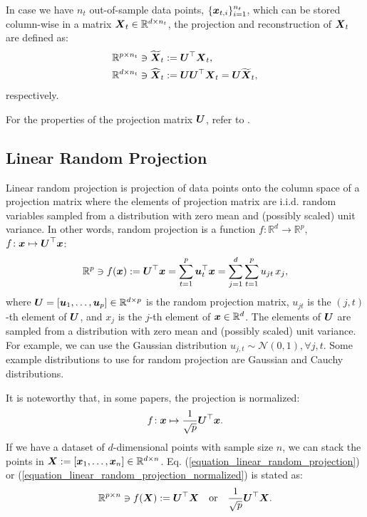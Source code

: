 \documentclass{article}
\def\b{\ensuremath\boldsymbol}
\begin{document}
In case we have $n_t$ out-of-sample data points, $\{\b{x}_{t,i}\}_{i=1}^{n_t}$, which can be stored column-wise in a matrix $\b{X}_t \in \mathbb{R}^{d \times n_t}$, the projection and reconstruction of $\b{X}_t$ are defined as:
\begin{align}
&\mathbb{R}^{p \times n_t} \ni \widetilde{\b{X}}_t := \b{U}^\top \b{X}_t, \label{equation_projection_outOfSample_SeveralPoints_severalDirections} \\
&\mathbb{R}^{d \times n_t} \ni \widehat{\b{X}}_t := \b{U}\b{U}^\top \b{X}_t = \b{U} \widetilde{\b{X}}_t, \label{equation_reconstruction_outOfSample_SeveralPoints_severalDirections}
\end{align}
respectively.

For the properties of the projection matrix $\b{U}$, refer to \cite{ghojogh2019unsupervised}.

\subsection{Linear Random Projection}

Linear random projection is projection of data points onto the column space of a projection matrix where the elements of projection matrix are i.i.d. random variables sampled from a distribution with zero mean and (possibly scaled) unit variance. In other words, random projection is a function $f\!: \mathbb{R}^d \rightarrow \mathbb{R}^p$, $f\!: \b{x} \mapsto \b{U}^\top \b{x}$:
\begin{align}\label{equation_linear_random_projection}
\mathbb{R}^p \ni f(\b{x}) := \b{U}^\top \b{x} = \sum_{t=1}^p \b{u}_t^\top \b{x} = \sum_{j=1}^d \sum_{t=1}^p u_{jt}\, x_j,
\end{align}
where $\b{U} = [\b{u}_1, \dots, \b{u}_p] \in \mathbb{R}^{d \times p}$ is the random projection matrix, $u_{jt}$ is the $(j,t)$-th element of $\b{U}$, and $x_j$ is the $j$-th element of $\b{x} \in \mathbb{R}^d$. 
The elements of $\b{U}$ are sampled from a distribution with zero mean and (possibly scaled) unit variance. For example, we can use the Gaussian distribution $u_{j,t} \sim \mathcal{N}(0, 1), \forall j,t$. 
Some example distributions to use for random projection are Gaussian \cite{giryes2016deep} and Cauchy \cite{li2007nonlinear,ramirez2012reconstruction} distributions. 

It is noteworthy that, in some papers, the projection is normalized:
\begin{align}\label{equation_linear_random_projection_normalized}
f\!: \b{x} \mapsto \frac{1}{\sqrt{p}} \b{U}^\top \b{x}.
\end{align}
If we have a dataset of $d$-dimensional points with sample size $n$, we can stack the points in $\b{X} := [\b{x}_1, \dots, \b{x}_n] \in \mathbb{R}^{d \times n}$. 
Eq. (\ref{equation_linear_random_projection}) or (\ref{equation_linear_random_projection_normalized}) is stated as:
\begin{align}
\mathbb{R}^{p \times n} \ni f(\b{X}) := \b{U}^\top \b{X} \quad \text{or} \quad \frac{1}{\sqrt{p}} \b{U}^\top \b{X}.
\end{align}
\end{document}
